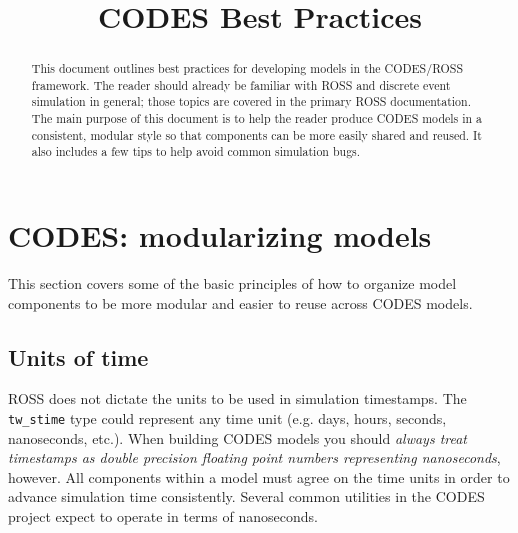 \documentclass[conference,10pt,compsocconf,onecolumn]{IEEEtran}
\begin{document}
\title{CODES Best Practices}





\renewcommand{\thetable}{\arabic{table}}

\maketitle

\begin{abstract}
This document outlines best practices for developing models in the
CODES/ROSS framework.  The reader should already be familiar with ROSS
and discrete event simulation in general; those topics are covered in the primary
ROSS documentation.
%
The main purpose of this document is to help the reader produce
CODES models in a consistent, modular style so that components can be more
easily shared and reused.  It also includes a few tips to help avoid common
simulation bugs.
\end{abstract}

\section{CODES: modularizing models}

This section covers some of the basic principles of how to organize model
components to be more modular and easier to reuse across CODES models.

\subsection{Units of time}

ROSS does not dictate the units to be used in simulation timestamps.
The \texttt{tw\_stime} type could represent any time unit
(e.g. days, hours, seconds, nanoseconds, etc.).  When building CODES
models you should \emph{always treat timestamps as double precision floating
point numbers representing nanoseconds}, however.
All components within a model must agree on the time units in order to
advance simulation time consistently.  Several common utilities in the
CODES project expect to operate in terms of nanoseconds.
\end{document}
